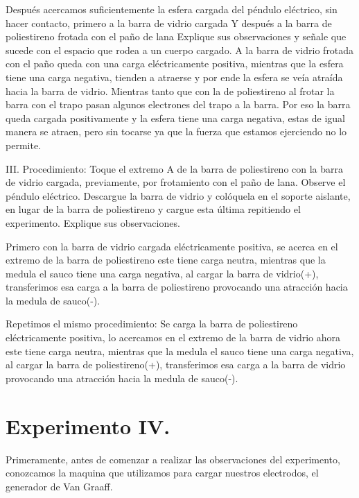 \documentclass[14pt]{article}
\begin{document}
Después acercamos suficientemente la esfera cargada del péndulo eléctrico, sin hacer contacto, primero a la barra de vidrio cargada
Y después a la barra de poliestireno frotada con el paño de lana
 Explique sus observaciones y señale que sucede con el espacio que rodea a un cuerpo cargado.
A la barra de vidrio frotada con el paño queda con una carga eléctricamente positiva, mientras que la esfera tiene una carga negativa, tienden a atraerse y por ende la esfera se veía atraída hacia la barra de vidrio.
Mientras tanto que con la de poliestireno al frotar la barra con el trapo pasan algunos electrones del trapo a la barra. Por eso la barra queda cargada positivamente y la esfera tiene una carga negativa, estas de igual manera se atraen, pero sin tocarse ya que la fuerza que estamos ejerciendo no lo permite.

III. Procedimiento: Toque el extremo A de la barra de poliestireno con la barra de vidrio cargada, previamente, por frotamiento con el paño de lana. Observe el péndulo eléctrico. Descargue la barra de vidrio y colóquela en el soporte aislante, en lugar de la barra de poliestireno y cargue esta última repitiendo el experimento. Explique sus observaciones.
\begin{figure}[h]
	\center
	\hspace{0.3\textwidth}
\end{figure}


Primero con la barra de vidrio cargada eléctricamente positiva, se acerca en el extremo de la barra de poliestireno este tiene carga neutra, mientras que la medula el sauco tiene una carga negativa, al cargar la barra de vidrio(+), transferimos esa carga a la barra de poliestireno provocando una atracción hacia la medula de sauco(-).

Repetimos el mismo procedimiento:
Se carga la barra de poliestireno eléctricamente positiva, lo acercamos en el extremo de la barra de vidrio ahora este tiene carga neutra, mientras que la medula el sauco tiene una carga negativa, al cargar la barra de poliestireno(+), transferimos esa carga a la barra de vidrio provocando una atracción hacia la medula de sauco(-).
\section{Experimento IV.}

Primeramente, antes de comenzar a realizar las observaciones del experimento, conozcamos la maquina que utilizamos para cargar nuestros electrodos, el generador de Van Graaff.
\end{document}
